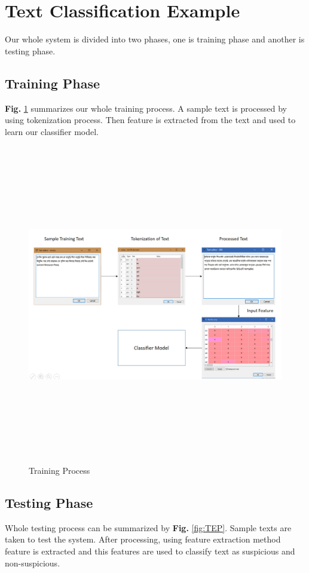 \section{Text Classification Example}
Our whole system is divided into two phases, one is training phase and another is testing phase.
\subsection{Training Phase}
\textbf{Fig.} \ref{fig:TP} summarizes our whole training process. A sample text is processed by using tokenization process. Then feature is extracted from the text and used to learn our classifier model.
\vspace{1cm}
\begin{figure}[h!]
    \centering
    \includegraphics[width=15cm,height=14cm]{Figures/training_phase.PNG}
    \caption{Training Process}
    \label{fig:TP}
\end{figure}
\clearpage
\subsection{Testing Phase}
Whole testing process can be summarized by \textbf{Fig.} \ref{fig:TEP}. Sample texts are taken to test the system. After processing, using feature extraction method feature is extracted and this features are used to classify text as suspicious and non-suspicious.

